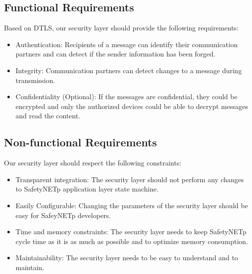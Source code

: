 \subsection{Functional Requirements}

Based on DTLS, our security layer should provide the following requirements:

\renewcommand{\labelitemi}{$\bullet$}
\begin{itemize}
\item Authentication: Recipients of a message can identify their communication partners and can detect
if the sender information has been forged.\\

\item Integrity: Communication partners can detect changes to a message during transmission.\\

\item Confidentiality (Optional): If the messages are confidential, they could be encrypted and only
the authorized devices could be able to decrypt messages and read the content.
\end{itemize}

\subsection{Non-functional Requirements}

Our security layer should respect the following constraints:

\renewcommand{\labelitemi}{$\bullet$}
\begin{itemize}

\item Transparent integration: The security layer should not perform any changes to SafetyNETp application
layer state machine.\\

\item Easily Configurable: Changing the parameters of the security layer should be easy for SafeyNETp developers.\\

\item Time and memory constraints: The security layer needs to keep SafetyNETp cycle time as it is as much as possible
and to optimize memory consumption.\\

\item Maintainability: The security layer needs to be easy to understand and to maintain.


\end{itemize}

